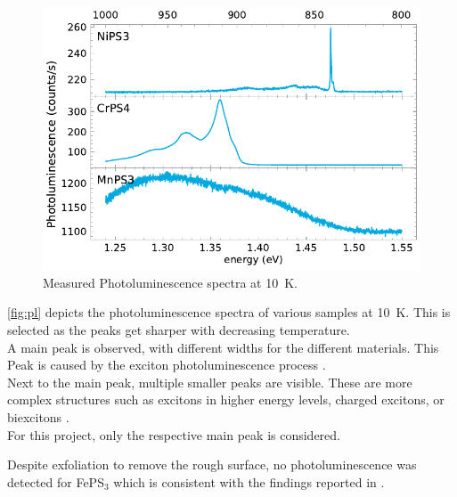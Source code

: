 \documentclass[
	oneside,
	parskip=half,
	a4paper,
]{scrbook}
\begin{document}
\begin{figure}
	\centering
	\includegraphics{../figures/2023-12-10 Combined PL.pdf}
	\caption{Measured Photoluminescence spectra at \SI{10}{K}.}
	\label{fig:pl}
\end{figure}
\autoref{fig:pl} depicts the photoluminescence spectra of various samples at \SI{10}{K}.
This is selected as the peaks get sharper with decreasing temperature.\\
A main peak is observed, with different widths for the different materials. 
This Peak is caused by the exciton photoluminescence process \cite{NiPS3_exciton,CrPS4_pl}.\\
Next to the main peak, multiple smaller peaks are visible.
These are more complex structures such as excitons in higher energy levels, charged excitons, or biexcitons \cite{CrPS4_pl, NiPS3_exciton,NiPS3_anisotropic, NiPS3_coherent}.\\
For this project, only the respective main peak is considered.

Despite exfoliation to remove the rough surface, no photoluminescence was detected for FePS$_3$ which is consistent with the findings reported in \cite{FePS3_pl}.
\end{document}
